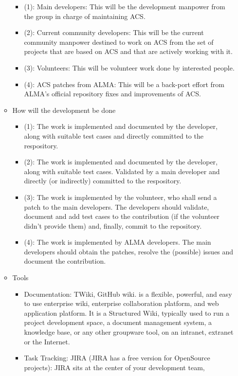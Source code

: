 \begin{itemize}
\begin{itemize}
			\begin{itemize}
				\item (1): Main developers: This will be the development manpower from the group in charge of maintaining ACS.
				\item (2): Current community developers: This will be the current community manpower destined to work on 
				ACS from the set of projects that are based on ACS and that are actively working with it.
				\item (3): Volunteers: This will be volunteer work done by interested people.
				\item (4): ACS patches from ALMA: This will be a back-port effort from ALMA's official repository fixes and improvements of ACS.
			\end{itemize}
			\item How will the development be done
			\begin{itemize}
				\item (1): The work is implemented and documented by the developer, along with suitable test cases and directly committed 
					to the respository.
				\item (2): The work is implemented and documented by the developer, along with suitable test cases. Validated by a main 
					developer and directly (or indirectly) committed to the respository.
				\item (3): The work is implemented by the volunteer, who shall send a patch to the main developers. The developers should 
					validate, document and add test cases to the contribution (if the volunteer didn't provide them) and, finally, 
					commit to the repository.
				\item (4): The work is implemented by ALMA developers. The main developers should obtain the patches, resolve the 								(possible) issues and document the contribution.
			\end{itemize}
			\item Tools
			\begin{itemize}
				\item Documentation: TWiki, GitHub wiki. is a flexible, powerful, and easy to use enterprise wiki, enterprise collaboration platform, 
					and web application platform. It is a Structured Wiki, typically used to run a project development space, a document 
					management system, a knowledge base, or any other groupware tool, on an intranet, extranet or the Internet. 
				\item Task Tracking: JIRA (JIRA has a free version for OpenSource projects): JIRA sits at the center of your development team, 

\end{itemize}
\end{itemize}
\end{itemize}
